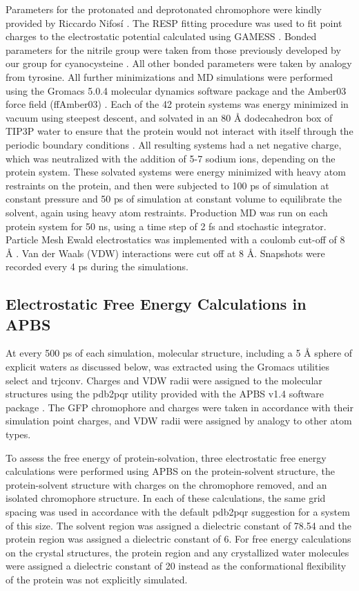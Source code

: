 Parameters for the protonated and deprotonated chromophore were kindly provided by Riccardo Nifos\'i \cite{Nifosi2003}.
The RESP fitting procedure was used to fit point charges to the electrostatic potential calculated using GAMESS \cite{Bayly1993}.
Bonded parameters for the nitrile group were taken from those previously developed by our group for cyanocysteine \cite{Ragain2012}.
All other bonded parameters were taken by analogy from tyrosine. 
All further minimizations and MD simulations were performed using the Gromacs 5.0.4 molecular dynamics software package \cite{VanDerSpoel2005, Abraham2015} and the Amber03 force field (ffAmber03) \cite{Duan2003, Sorin2005}.
Each of the 42 protein systems was energy minimized in vacuum using steepest descent, and solvated in an 80 \si{\angstrom} dodecahedron box of TIP3P water to ensure that the protein would not interact with itself through the periodic boundary conditions \cite{Jorgensen1983}.
All resulting systems had a net negative charge, which was neutralized with the addition of 5-7 sodium ions, depending on the protein system. 
These solvated systems were energy minimized with heavy atom restraints on the protein, and then were subjected to 100 ps of simulation at constant pressure and 50 ps of simulation at constant volume to equilibrate the solvent, again using heavy atom restraints. 
Production MD was run on each protein system for 50 \si{\ns}, using a time step of 2 fs and stochastic integrator. 
Particle Mesh Ewald electrostatics was implemented with a coulomb cut-off of 8 \si{\angstrom} \cite{Cheatham1995}.
Van der Waals (VDW) interactions were cut off at 8 \si{\angstrom}. 
Snapshots were recorded every 4 ps during the simulations.  

\subsection{Electrostatic Free Energy Calculations in APBS}

At every 500 ps of each simulation, molecular structure, including a 5 \si{\angstrom} sphere of explicit waters as discussed below, was extracted using the Gromacs utilities select and trjconv. 
Charges and VDW radii were assigned to the molecular structures using the pdb2pqr utility provided with the APBS v1.4 software package \cite{Dolinsky2007}.
The GFP chromophore and \pCNF{} charges were taken in accordance with their simulation point charges, and VDW radii were assigned by analogy to other atom types.

To assess the free energy of protein-solvation, three electrostatic free energy calculations were performed using APBS on the protein-solvent structure, the protein-solvent structure with charges on the chromophore removed, and an isolated chromophore structure. 
In each of these calculations, the same grid spacing was used in accordance with the default pdb2pqr suggestion for a system of this size. 
The solvent region was assigned a dielectric constant of 78.54 and the protein region was assigned a dielectric constant of 6. 
For free energy calculations on the crystal structures, the protein region and any crystallized water molecules were assigned a dielectric constant of 20 instead as the conformational flexibility of the protein was not explicitly simulated.

